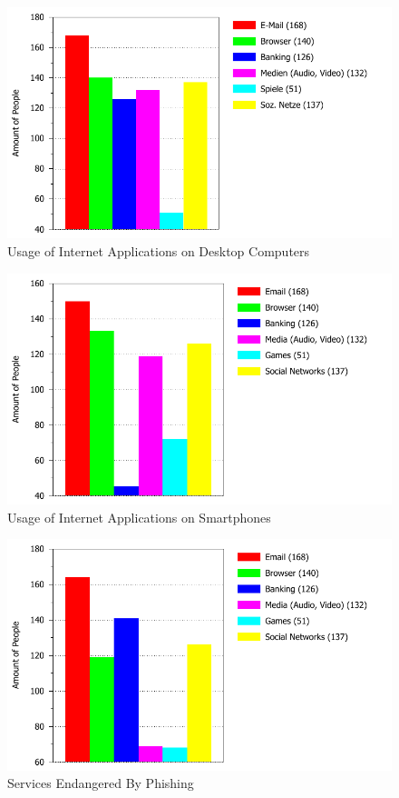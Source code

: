 \begin{figure}[hHtbp]
\centering
\includegraphics[width=1.0\textwidth]{graphix/202_Usage_Applications_Desktop.pdf}%
\caption{Usage of Internet Applications on Desktop Computers}%
\label{fig:desktop_apps}%
\end{figure}

\begin{figure}[hHtbp]
\includegraphics[width=1.0\textwidth]{graphix/204_Usage_Applications_Smartphone.pdf}%
\caption{Usage of Internet Applications on Smartphones}%
\label{fig:smartphone_apps}%
\end{figure}

\begin{figure}[hHtbp]
\includegraphics[width=1.0\textwidth]{graphix/401_Endangered_Services.pdf}%
\caption{Services Endangered By Phishing}%
\label{fig:endangered_services}%
\end{figure}


